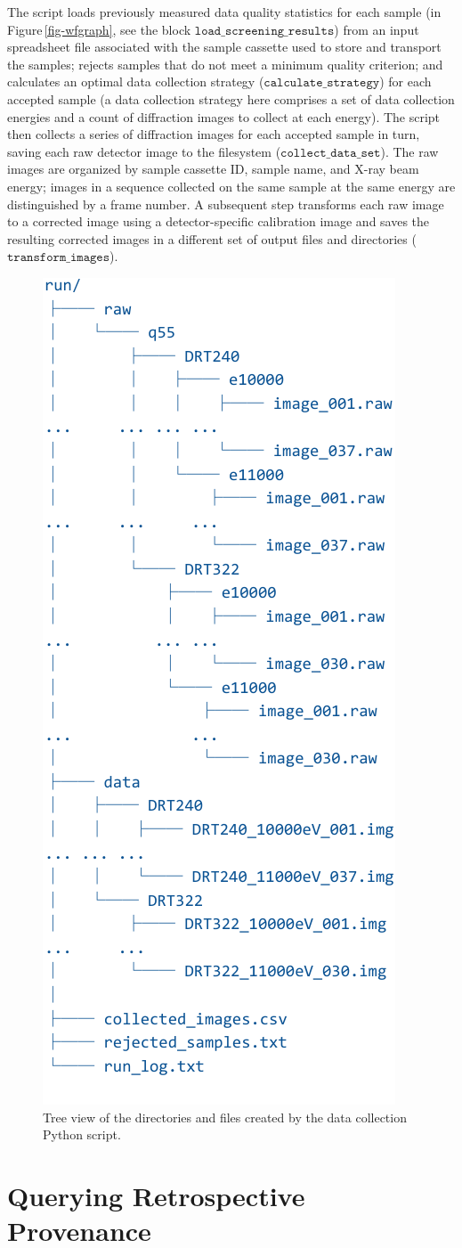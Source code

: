 \documentclass[letterpaper,twocolumn,10pt]{article}
\newcommand{\Figref}[1]{Figure\,\ref{#1}}
\newcommand{\code}[1]{\ensuremath{\mathtt{#1}}}
\begin{document}
The script loads previously measured data quality statistics for each
sample (in \Figref{fig-wfgraph}, see the block
\code{load\_screening\_results}) from an input spreadsheet file
associated with the sample cassette used to store and transport the
samples; rejects samples that do not meet a minimum quality criterion;
and calculates an optimal data collection strategy
(\code{calculate\_strategy}) for each accepted sample (a data
collection strategy here comprises a set of data collection energies
and a count of diffraction images to collect at each energy). The
script then collects a series of diffraction images for each accepted
sample in turn, saving each raw detector image to the filesystem
(\code{collect\_data\_set}). The raw images are organized by sample
cassette ID, sample name, and X-ray beam energy; images in a sequence
collected on the same sample at the same energy are distinguished by a
frame number. A subsequent step transforms each raw image to a
corrected image using a detector-specific calibration image and saves
the resulting corrected images in a different set of output files and
directories (\code{transform\_images}).

\begin{figure}[thb]
  \centering
  \includegraphics[width=.3\textwidth]{tree-abbrev-crop.pdf}
  \caption{\small Tree view of the directories and files created by
    the data collection Python script.}
  \label{fig-data-tree}
\end{figure}


\section{Querying Retrospective Provenance} 
\label{sec:queries}
\end{document}
